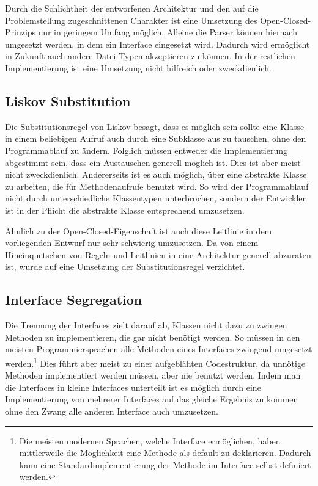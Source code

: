 {	Durch die Schlichtheit der entworfenen Architektur und den auf die Problemstellung zugeschnittenen Charakter ist eine Umsetzung des Open-Closed-Prinzips nur in geringem Umfang möglich. Alleine die Parser können hiernach umgesetzt werden, in dem ein Interface eingesetzt wird. Dadurch wird ermöglicht in Zukunft auch andere Datei-Typen akzeptieren zu können.
	In der restlichen Implementierung ist eine Umsetzung nicht hilfreich oder zweckdienlich.
	
	\subsection{Liskov Substitution}
	Die Substitutionsregel von Liskov besagt, dass es möglich sein sollte eine Klasse in einem beliebigen Aufruf auch durch eine Subklasse aus zu tauschen, ohne den Programmablauf zu ändern.
	Folglich müssen entweder die Implementierung abgestimmt sein, dass ein Austauschen generell möglich ist. Dies ist aber meist nicht zweckdienlich.
	Andererseits ist es auch möglich, über eine abstrakte Klasse zu arbeiten, die für Methodenaufrufe benutzt wird. So wird der Programmablauf nicht durch unterschiedliche Klassentypen unterbrochen, sondern der Entwickler ist in der Pflicht die abstrakte Klasse entsprechend umzusetzen.
	
	Ähnlich zu der Open-Closed-Eigenschaft ist auch diese Leitlinie in dem vorliegenden Entwurf nur sehr schwierig umzusetzen. Da von einem Hineinquetschen von Regeln und Leitlinien in eine Architektur generell abzuraten ist, wurde auf eine Umsetzung der Substitutionsregel verzichtet.
	
	\subsection{Interface Segregation}
	Die Trennung der Interfaces zielt darauf ab, Klassen nicht dazu zu zwingen Methoden zu implementieren, die gar nicht benötigt werden. So müssen in den meisten Programmiersprachen alle Methoden eines Interfaces zwingend umgesetzt werden.\footnote{Die meisten modernen Sprachen, welche Interface ermöglichen, haben mittlerweile die Möglichkeit eine Methode als default zu deklarieren. Dadurch kann eine Standardimplementierung der Methode im Interface selbst definiert werden.} Dies führt aber meist zu einer aufgeblähten Codestruktur, da unnötige Methoden implementiert werden müssen, aber nie benutzt werden.
	Indem man die Interfaces in kleine Interfaces unterteilt ist es möglich durch eine Implementierung von mehrerer Interfaces auf das gleiche Ergebnis zu kommen ohne den Zwang alle anderen Interface auch umzusetzen.
	
}
